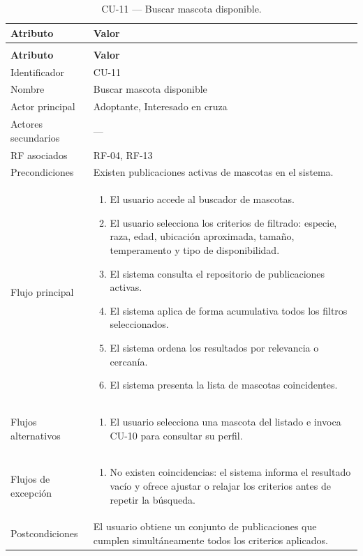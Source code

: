 \documentclass[journal,onecolumn]{IEEEtran}
\makeatletter
\newenvironment{atributos}[2]{%
	\small
	\begin{longtable}{@{}>{\raggedright\arraybackslash}p{4.2cm} >{\raggedright\arraybackslash}p{11.2cm}@{}}
		\caption{#2}\label{tab:#1}\\
		\toprule
		\textbf{Atributo} & \textbf{Valor} \\
		\midrule
		\endfirsthead
		\multicolumn{2}{@{}l}{\small\itshape (continuación)}\\
		\toprule
		\textbf{Atributo} & \textbf{Valor} \\
		\midrule
		\endhead
		\bottomrule
		\endlastfoot
	}{%
	\end{longtable}
	\normalsize
}
\makeatother
\begin{document}
	\begin{atributos}{CU-11}{CU-11 --- Buscar mascota disponible.}
		Identificador & CU-11 \\
		Nombre & Buscar mascota disponible \\
		Actor principal & Adoptante, Interesado en cruza \\
		Actores secundarios & --- \\
		RF asociados & RF-04, RF-13 \\
		Precondiciones & Existen publicaciones activas de mascotas en el sistema. \\
		Flujo principal &
		\begin{enumerate}[leftmargin=*, nosep]
			\item El usuario accede al buscador de mascotas.
			\item El usuario selecciona los criterios de filtrado: especie, raza, edad, ubicación aproximada, tamaño, temperamento y tipo de disponibilidad.
			\item El sistema consulta el repositorio de publicaciones activas.
			\item El sistema aplica de forma acumulativa todos los filtros seleccionados.
			\item El sistema ordena los resultados por relevancia o cercanía.
			\item El sistema presenta la lista de mascotas coincidentes.
		\end{enumerate} \\
		Flujos alternativos &
		\begin{enumerate}[leftmargin=*, nosep]
			\item[6.1] El usuario selecciona una mascota del listado e invoca CU-10 para consultar su perfil.
		\end{enumerate} \\
		Flujos de excepción &
		\begin{enumerate}[leftmargin=*, nosep]
			\item[5.1] No existen coincidencias: el sistema informa el resultado vacío y ofrece ajustar o relajar los criterios antes de repetir la búsqueda.
		\end{enumerate} \\
		Postcondiciones & El usuario obtiene un conjunto de publicaciones que cumplen simultáneamente todos los criterios aplicados. \\
	\end{atributos}
	
\end{document}
